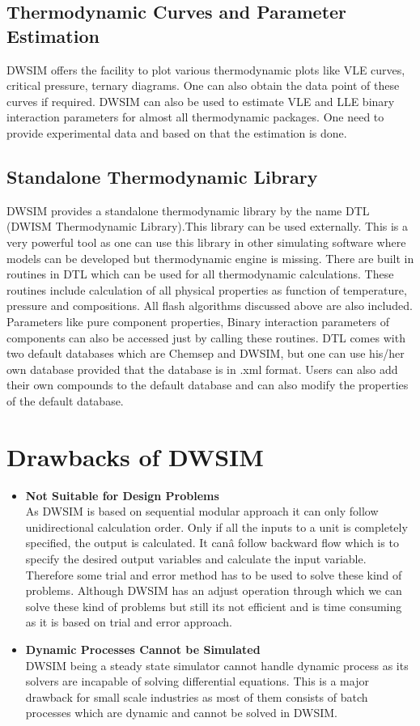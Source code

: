 \documentclass[12pt]{report}
\begin{document}
\subsection {Thermodynamic Curves and Parameter Estimation}
DWSIM offers the facility to plot various thermodynamic plots like VLE curves, critical pressure, ternary diagrams. One can also obtain the data point of these curves if required.
DWSIM can also be used to estimate VLE and LLE binary interaction parameters for almost all thermodynamic packages. One need to provide experimental data and based on that the estimation is done.

\subsection{Standalone Thermodynamic Library}
DWSIM provides a standalone thermodynamic library by the name DTL (DWISM Thermodynamic Library).This library can be used externally.
This is a very powerful tool as one can use this library in other simulating software where models can be developed but thermodynamic engine is missing.
There are built in routines in DTL which can be used for all thermodynamic calculations. These routines include calculation of all physical properties as function of temperature, pressure and compositions. All flash algorithms discussed above are also included. Parameters like pure component properties, Binary interaction parameters of components can also be accessed just by calling these routines.
DTL comes with two default databases which are Chemsep and DWSIM, but one can use his/her own database provided that the database is in .xml format. Users can also add their own compounds to the default database and can also modify the properties of the default database.

\section{Drawbacks of DWSIM}
\begin{itemize}
\item {\textbf{Not Suitable for Design Problems}} \\
As DWSIM is based on sequential modular approach it can only follow unidirectional calculation order. Only if all the inputs to a unit is completely specified, the output is calculated. It canâ  follow backward flow which is to specify the desired output variables and calculate the input variable. Therefore some trial and error method has to be used to solve these kind of problems. Although DWSIM has an adjust operation through which we can solve these kind of problems but still its not efficient and is time consuming as it is based on trial and error approach.

\item{\textbf{Dynamic Processes Cannot be Simulated}} \\
DWSIM being a steady state simulator cannot handle dynamic process as its solvers are incapable of solving differential equations. This is a major drawback for small scale industries as most of them consists of batch processes which are dynamic and cannot be solved in DWSIM.

\end{itemize}
\end{document}
